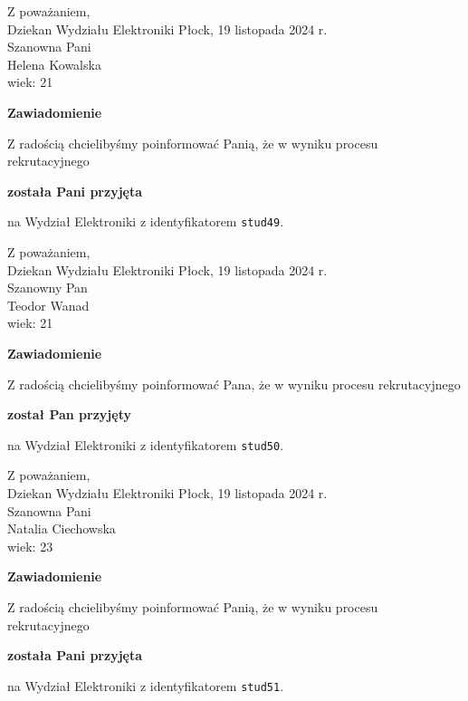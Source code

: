 \documentclass[12pt,a4paper]{article}
\begin{document}
\noindent
Z poważaniem,\\
Dziekan
Wydziału Elektroniki
\newpage
\hfill Płock, 19 listopada 2024 r.\\ 
\noindent 
Szanowna Pani \\
Helena Kowalska \\
wiek: 21

\bigskip

\begin{center}
{\Large\textbf{Zawiadomienie}}
\end{center}
\bigskip
Z radością chcielibyśmy poinformować Panią, że w wyniku procesu rekrutacyjnego
\begin{center}
\textsf{\textbf{została Pani przyjęta}} 
\end{center}
na Wydział Elektroniki z identyfikatorem \verb|stud49|.
\vspace{2cm}

\noindent
Z poważaniem,\\
Dziekan
Wydziału Elektroniki
\newpage
\hfill Płock, 19 listopada 2024 r.\\ 
\noindent 
Szanowny Pan \\
Teodor Wanad \\
wiek: 21

\bigskip

\begin{center}
{\Large\textbf{Zawiadomienie}}
\end{center}
\bigskip
Z radością chcielibyśmy poinformować Pana, że w wyniku procesu rekrutacyjnego
\begin{center}
\textsf{\textbf{został Pan przyjęty}} 
\end{center}
na Wydział Elektroniki z identyfikatorem \verb|stud50|.
\vspace{2cm}

\noindent
Z poważaniem,\\
Dziekan
Wydziału Elektroniki
\newpage
\hfill Płock, 19 listopada 2024 r.\\ 
\noindent 
Szanowna Pani \\
Natalia Ciechowska \\
wiek: 23

\bigskip

\begin{center}
{\Large\textbf{Zawiadomienie}}
\end{center}
\bigskip
Z radością chcielibyśmy poinformować Panią, że w wyniku procesu rekrutacyjnego
\begin{center}
\textsf{\textbf{została Pani przyjęta}} 
\end{center}
na Wydział Elektroniki z identyfikatorem \verb|stud51|.
\vspace{2cm}
\end{document}
